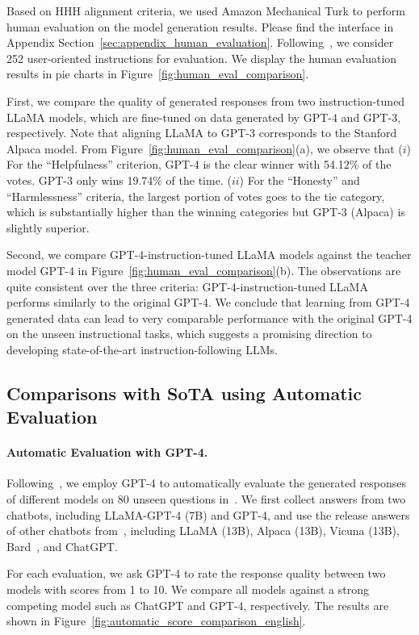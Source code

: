 Based on HHH alignment criteria, we used Amazon Mechanical Turk to perform human evaluation on the model generation results. Please find the interface in Appendix Section~\ref{sec:appendix_human_evaluation}. Following~\citep{wang2022self,alpaca}, we consider 252 user-oriented instructions for evaluation. We display the human evaluation results in pie charts in Figure~\ref{fig:human_eval_comparison}. 

First, we compare the quality of generated responses from two instruction-tuned LLaMA models, which are fine-tuned on data generated by GPT-4 and GPT-3, respectively. Note that aligning LLaMA to GPT-3 corresponds to the Stanford Alpaca model. From Figure~\ref{fig:human_eval_comparison}(a), we observe that ($i$) For the ``Helpfulness'' criterion, GPT-4 is the clear winner with 54.12\% of the votes. GPT-3 only wins 19.74\% of the time. ($ii$) For the ``Honesty'' and ``Harmlessness'' criteria, the largest portion of votes goes to the tie category, which is substantially higher than the winning categories but GPT-3 (Alpaca) is slightly superior.

Second, we compare GPT-4-instruction-tuned LLaMA models against the teacher model GPT-4 in Figure~\ref{fig:human_eval_comparison}(b). The observations are quite consistent over the three criteria: GPT-4-instruction-tuned LLaMA performs similarly to the original GPT-4. We conclude that learning from GPT-4 generated data can lead to very comparable performance with the original GPT-4 on the unseen instructional tasks, which suggests a promising direction to developing state-of-the-art instruction-following LLMs. 

\subsection{Comparisons with SoTA using Automatic Evaluation}

\paragraph{Automatic Evaluation with GPT-4.} Following~\citep{vicuna}, we employ GPT-4 to automatically evaluate the generated responses of different models on 80 unseen questions in~\citep{vicuna}. We first collect answers from two chatbots, including LLaMA-GPT-4 (7B) and GPT-4, and use the release answers of other chatbots from~\citep{vicuna}, including LLaMA (13B), Alpaca (13B), Vicuna (13B), Bard~\citep{bard}, and ChatGPT.  

For each evaluation, we ask GPT-4 to rate the response quality between two models with scores from 1 to 10. We compare all models against a strong competing model such as ChatGPT and GPT-4, respectively. The results are shown in Figure~\ref{fig:automatic_score_comparison_english}.

